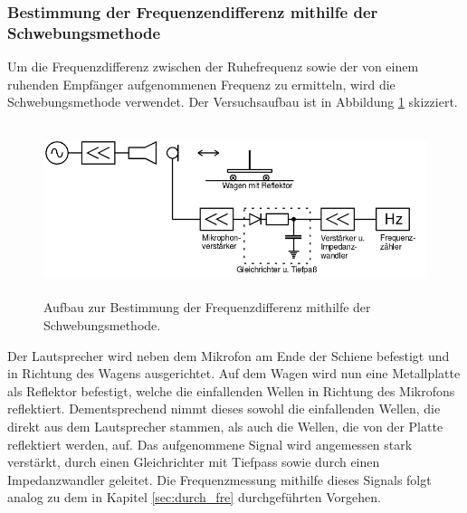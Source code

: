 \subsubsection{Bestimmung der Frequenzendifferenz mithilfe der Schwebungsmethode}
Um die Frequenzdifferenz zwischen der Ruhefrequenz sowie der von einem ruhenden Empfänger aufgenommenen Frequenz zu ermitteln, wird die Schwebungsmethode verwendet.
Der Versuchsaufbau ist in Abbildung \ref{tfig:3} skizziert.
\begin{figure}
  \centering
  \includegraphics[height=5cm]{aufbau3.png}
  \caption{Aufbau zur Bestimmung der Frequenzdifferenz mithilfe der Schwebungsmethode.}
  \label{tfig:3}
\end{figure}
Der Lautsprecher wird neben dem Mikrofon am Ende der Schiene befestigt und in Richtung des Wagens ausgerichtet. Auf dem Wagen wird nun eine Metallplatte als Reflektor befestigt, welche die einfallenden Wellen in Richtung des Mikrofons reflektiert.
Dementsprechend nimmt dieses sowohl die einfallenden Wellen, die direkt aus dem Lautsprecher stammen, als auch die Wellen, die von der Platte reflektiert werden, auf.
Das aufgenommene Signal wird angemessen stark verstärkt, durch einen Gleichrichter mit Tiefpass sowie durch einen Impedanzwandler geleitet.
Die Frequenzmessung mithilfe dieses Signals folgt analog zu dem in Kapitel \ref{sec:durch_fre} durchgeführten Vorgehen.

